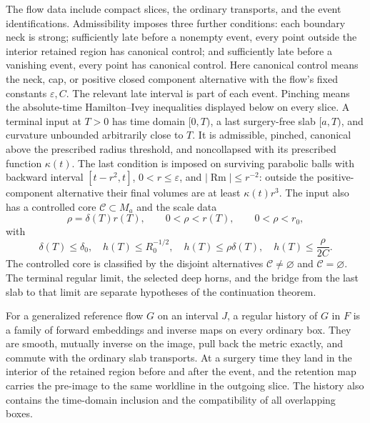 The flow data include compact slices, the ordinary transports, and the
event identifications.  Admissibility imposes three further conditions:
each boundary neck is strong; sufficiently late before a nonempty event,
every point outside the interior retained region has canonical control;
and sufficiently late before a vanishing event, every point has canonical
control.  Here canonical control means the neck, cap, or positive closed
component alternative with the flow's fixed constants $\varepsilon,C$.
The relevant late interval is part of each event.  Pinching means the
absolute-time Hamilton--Ivey inequalities displayed below on every slice.
A terminal
input at $T>0$ has time domain $[0,T)$, a last surgery-free slab
$[a,T)$, and curvature unbounded arbitrarily close to $T$.  It is
admissible, pinched, canonical above the prescribed radius threshold,
and noncollapsed with its prescribed function $\kappa(t)$.
The last condition is imposed on surviving parabolic balls with
backward interval $[t-r^2,t]$, $0<r\leq\varepsilon$, and
$|\operatorname{Rm}|\leq r^{-2}$: outside the positive-component
alternative their final volumes are at least $\kappa(t)r^3$.
The input also has a controlled core $\mathcal C\subset M_a$
and the scale data
\[
  \rho=\delta(T)r(T),\qquad 0<\rho<r(T),\qquad
  0<\rho<r_0,
\]
with
\[
 \delta(T)\leq\delta_0,\quad
 h(T)\leq R_0^{-1/2},\quad
 h(T)\leq\rho\delta(T),\quad
 h(T)\leq\frac{\rho}{2C}.
\]
The controlled core is classified by the disjoint alternatives
$\mathcal C\ne\varnothing$ and $\mathcal C=\varnothing$.
The terminal regular limit, the
selected deep horns, and the bridge from the last slab to that limit are
separate hypotheses of the continuation theorem.

\begin{definition}
\label{def:surgery-regular-history}
For a generalized reference flow $G$ on an interval $J$, a regular history
of $G$ in $F$ is a family of forward embeddings and inverse maps on every
ordinary box.  They are smooth, mutually inverse on the image, pull back the
metric exactly, and commute with the ordinary slab transports.  At a surgery
time they land in the interior of the retained region before and after the
event, and the retention map carries the pre-image to the same worldline in
the outgoing slice.  The history also contains the time-domain inclusion and
the compatibility of all overlapping boxes.
\cite[Lemma 14.11 and Proposition 14.12, pp. 349--350;
Definition 15.8, pp. 361--362]{MT2007}
\end{definition}

